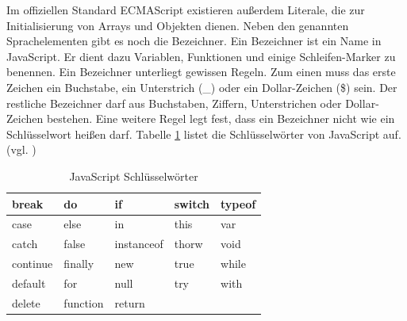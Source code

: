 \documentclass[12pt,a4paper,bibliography=totocnumbered,listof=totocnumbered]{scrartcl}
\begin{document}
Im offiziellen Standard ECMAScript existieren außerdem Literale, die zur Initialisierung von Arrays und Objekten dienen. Neben den genannten Sprachelementen gibt es noch die Bezeichner. Ein Bezeichner ist ein Name in JavaScript. Er dient dazu Variablen, Funktionen und einige Schleifen-Marker zu benennen. Ein Bezeichner unterliegt gewissen Regeln. Zum einen muss das erste Zeichen ein Buchstabe, ein Unterstrich (\_) oder ein Dollar-Zeichen (\$) sein. Der restliche Bezeichner darf aus Buchstaben, Ziffern, Unterstrichen oder Dollar-Zeichen bestehen. Eine weitere Regel legt fest, dass ein Bezeichner nicht wie ein Schlüsselwort heißen darf. Tabelle \ref{tab:jskeywords} listet die Schlüsselwörter von JavaScript auf.(vgl. \cite[S.19]{FlanJava2007})

\vspace{1em}
\begin{table}[!h]
	\centering
	\begin{tabular}{|l|l|l|l|l|}
		\hline
		break & do & if & switch & typeof\\
		\hline
		case & else & in & this & var\\
		\hline
		catch & false & instanceof & thorw & void\\
		\hline
		continue & finally & new & true & while\\
		\hline
		default & for & null & try & with\\
		\hline
		delete & function & return & &\\
		\hline
	\end{tabular}
	\caption{JavaScript Schlüsselwörter}
	\label{tab:jskeywords}
\end{table}
\end{document}
